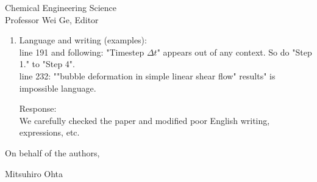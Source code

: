 \documentclass{letter}
\begin{document}
\begin{letter}{
Chemical Engineering Science\\
Professor Wei Ge, Editor\\}
\begin{enumerate}
Response: \\
In our computations, we set $g = 0$ because we wanted to clearly isolate only the effects of the density and viscosity ratios and 
wanted to compare with previous studies dealing with the deformation and breakup of a drop with $\lambda =1$ and $\eta = 1$.
When the gravity is considered, we obtain $Fr$ (Froude number) $\left(= \frac{{\it \Gamma}R}{\sqrt {gR}} \right)$ = 1.7 ($Re$ = 93 and $Ca$ = 0.3) 
and 1.9 ($Re = 43$ and $Ca$ = 0.8). \\
Although the values of $Fr$ are not so large, the effect of gravity (bubble rise motion) may not be completely negligible in terms of $Fr$.
However, bubbles for both conditions reach the breakup at $t$ = about 0.5 s. 
($V$ (moving wall speed) had about 1.1 $\sim$ 1.3 m/s for the range of $Ca$ and $Re$ in our computaions.)
Therefore, the effect of gravity (bubble rise motion) is expected to be negligible when juxtaposed with the measured tensile strength properties of bubble deformation and breakup 
around the critical $Re$ number conditions. Contrary to what the reviewer suggests, we believe that our computational results in which we only focus on the force balance between the driving shear flow and the bubble surface tension will provide fundamental knowledge and findings for practical applications.  In the revised paper, we have described these explanations.\\
\\
Please see lines 133 to 139.
\\

\par\noindent
\item
\textsf
{Language and writing (examples):\\
line 191 and following: "Timestep $\Delta t$" appears out of any context. So do "Step 1." to "Step 4".\\
line 232: ""bubble deformation in simple linear shear flow" results" is impossible language. \\}
\vspace{3 mm}

Response: \\
We carefully checked the paper and modified poor English writing, expressions, etc.\\

\end{enumerate}

\closing{On behalf of the authors,}
Mitsuhiro Ohta

\end{letter}
\end{document}
